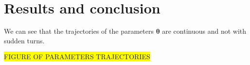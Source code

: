 \chapter{Results and conclusion}

We can see that the trajectories of the parameters $\boldsymbol \theta$ are continuous and not with sudden turns.

\colorbox{yellow}{FIGURE OF PARAMETERS TRAJECTORIES}